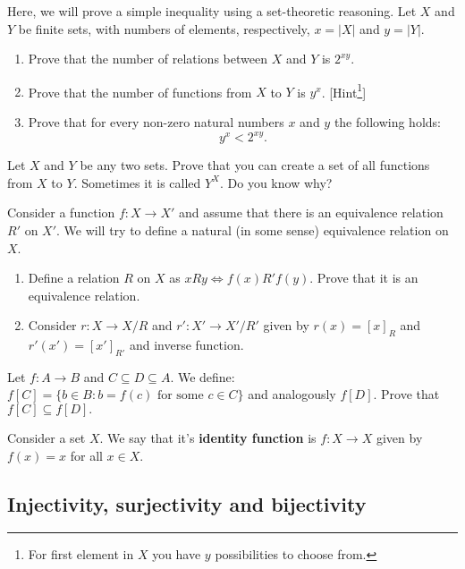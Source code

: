 \begin{exercise}
  Here, we will prove a simple inequality using a set-theoretic reasoning. Let $X$ and $Y$ be finite sets, with numbers of elements, respectively, $x=|X|$ and $y=|Y|$.
  \begin{enumerate}
    \item Prove that the number of relations between $X$ and $Y$ is $2^{xy}$.
    \item Prove that the number of functions from $X$ to $Y$ is $y^x$. [Hint\footnote{For first element in $X$ you have $y$ possibilities to choose from.}]
    \item Prove that for every non-zero natural numbers $x$ and $y$ the following holds:
      $$y^x<2^{xy}.$$
  \end{enumerate}
\end{exercise}

\begin{exercise}
  Let $X$ and $Y$ be any two sets. Prove that you can create a set of all functions from $X$ to $Y$. Sometimes it is called $Y^X$. Do you know why?
\end{exercise}

\begin{exercise}
  Consider a function $f: X\to X'$ and assume that there is an equivalence relation $R'$ on $X'$. We will try to define a natural (in some sense) equivalence relation on $X$.
  \begin{enumerate}
    \item Define a relation $R$ on $X$ as $xRy\Leftrightarrow f(x) R' f(y)$. Prove that it is an equivalence relation.
    \item Consider $r: X\to X/R$ and $r': X'\to X'/R'$ given by $r(x)=[x]_R$ and $r'(x')=[x']_{R'}$ and inverse function.
  \end{enumerate}
\end{exercise}

\begin{exercise}
	Let $f: A\to B$ and $C\subseteq D\subseteq A$. We define: $f[C] = \{b\in B : b=f(c) \text{ for some }c\in C \}$ and analogously $f[D]$. Prove that
	$f[C]\subseteq f[D].$
\end{exercise}

\begin{definition}
  Consider a set $X$. We say that it's \textbf{identity function} is $f:X\to X$ given by $f(x)=x$ for all $x\in X$.
\end{definition}

\subsection{Injectivity, surjectivity and bijectivity}

